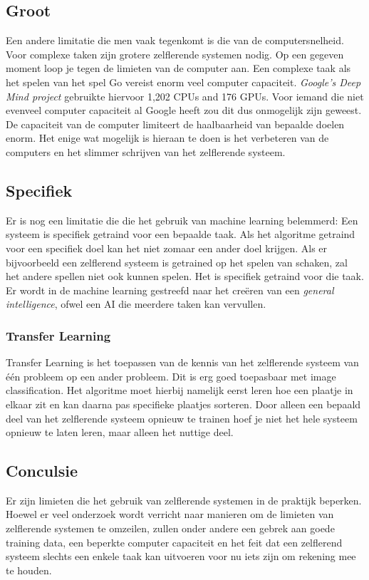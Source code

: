 \subsection{Groot}
Een andere limitatie die men vaak tegenkomt is die van de computersnelheid. Voor complexe taken zijn grotere zelflerende systemen nodig. Op een gegeven moment loop je tegen de limieten van de computer aan. Een complexe taak als het spelen van het spel Go vereist enorm veel computer capaciteit. \textit{Google’s Deep Mind project} gebruikte hiervoor 1,202 CPUs and 176 GPUs. \cite{GoogleDeepMindArticle}  Voor iemand die niet evenveel computer capaciteit al Google heeft zou dit dus onmogelijk zijn geweest. De capaciteit van de computer limiteert de haalbaarheid van bepaalde doelen enorm. Het enige wat mogelijk is hieraan te doen is het verbeteren van de computers en het slimmer schrijven van het zelflerende systeem.

\subsection{Specifiek}
Er is nog een limitatie die die het gebruik van machine learning belemmerd: Een systeem is specifiek getraind voor een bepaalde taak.  Als het algoritme getraind voor een specifiek doel kan het niet zomaar een ander doel krijgen. Als er bijvoorbeeld een zelflerend systeem is getrained op het spelen van schaken, zal het andere spellen niet ook kunnen spelen. Het is specifiek getraind voor die taak. Er wordt in de machine learning gestreefd naar het creëren van een \textit{general intelligence}, ofwel een AI die meerdere taken kan vervullen. 

\subsubsection{Transfer Learning}
Transfer Learning is het toepassen van de kennis van het zelflerende systeem van één probleem op een ander probleem. Dit is erg goed toepasbaar met image classification. Het algoritme moet hierbij namelijk eerst leren hoe een plaatje in elkaar zit en kan daarna pas specifieke plaatjes sorteren. Door alleen een bepaald deel van het zelflerende systeem opnieuw te trainen hoef je niet het hele systeem opnieuw te laten leren, maar alleen het nuttige deel. 

\subsection{Conculsie}
Er zijn limieten die het gebruik van zelflerende systemen in de praktijk beperken. Hoewel er veel onderzoek wordt verricht naar manieren om de limieten van zelflerende systemen te omzeilen, zullen onder andere een gebrek aan goede training data, een beperkte computer capaciteit en het feit dat een zelflerend systeem slechts een enkele taak kan uitvoeren voor nu iets zijn om rekening mee te houden.
